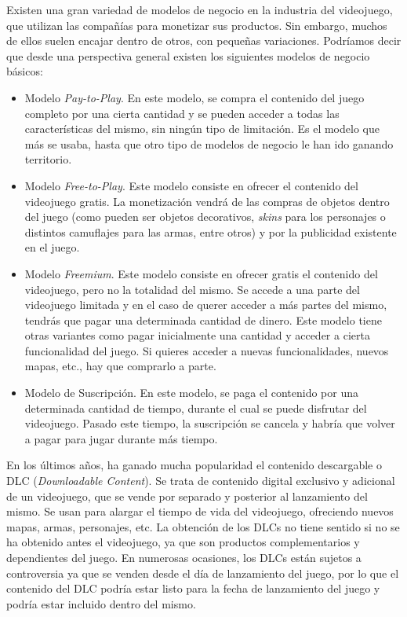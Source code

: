 Existen una gran variedad de modelos de negocio en la industria del videojuego, que utilizan las compañías para monetizar sus productos. Sin embargo, muchos de ellos suelen encajar dentro de otros, con pequeñas variaciones. Podríamos decir que desde una perspectiva general existen los siguientes modelos de negocio básicos:

\begin{itemize}
\item Modelo \textit{Pay-to-Play}. En este modelo, se compra el contenido del juego completo por una cierta cantidad y se pueden acceder a todas las características del mismo, sin ningún tipo de limitación. Es el modelo que más se usaba, hasta que otro tipo de modelos de negocio le han ido ganando territorio.
\item Modelo \textit{Free-to-Play}. Este modelo consiste en ofrecer el contenido del videojuego gratis. La monetización vendrá de las compras de objetos dentro del juego (como pueden ser objetos decorativos, \textit{skins} para los personajes o distintos camuflajes para las armas, entre otros) y por la publicidad existente en el juego.
\item Modelo \textit{Freemium}. Este modelo consiste en ofrecer gratis el contenido del videojuego, pero no la totalidad del mismo. Se accede a una parte del videojuego limitada y en el caso de querer acceder a más partes del mismo, tendrás que pagar una determinada cantidad de dinero. Este modelo tiene otras variantes como pagar inicialmente una cantidad y acceder a cierta funcionalidad del juego. Si quieres acceder a nuevas funcionalidades, nuevos mapas, etc., hay que comprarlo a parte.
\item Modelo de Suscripción. En este modelo, se paga el contenido por una determinada cantidad de tiempo, durante el cual se puede disfrutar del videojuego. Pasado este tiempo, la suscripción se cancela y habría que volver a pagar para jugar durante más tiempo.
\end{itemize}

En los últimos años, ha ganado mucha popularidad el contenido descargable o DLC (\textit{Downloadable Content}). Se trata de contenido digital exclusivo y adicional de un videojuego, que se vende por separado y posterior al lanzamiento del mismo. Se usan para alargar el tiempo de vida del videojuego, ofreciendo nuevos mapas, armas, personajes, etc. La obtención de los DLCs no tiene sentido si no se ha obtenido antes el videojuego, ya que son productos complementarios y dependientes del juego. En numerosas ocasiones, los DLCs están sujetos a controversia ya que se venden desde el día de lanzamiento del juego, por lo que el contenido del DLC podría estar listo para la fecha de lanzamiento del juego y podría estar incluido dentro del mismo.

